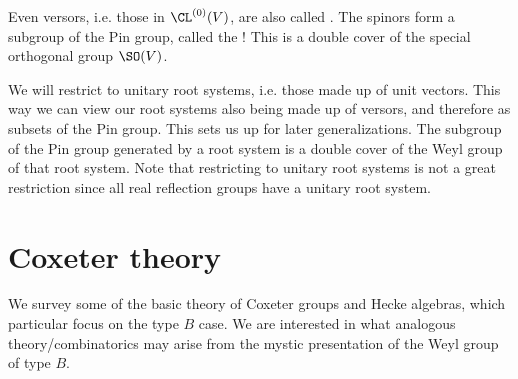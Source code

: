\nt Even versors, i.e. those in $\CL^{(0)}(V)$, are also called . The spinors form a subgroup of the Pin group, called the ! This is a double cover of the special orthogonal group $\SO(V)$.\bb

\nt We will restrict to unitary root systems, i.e. those made up of unit vectors. This way we can view our root systems also being made up of versors, and therefore as subsets of the Pin group. This sets us up for later generalizations. The subgroup of the Pin group generated by a root system is a double cover of the Weyl group of that root system. Note that restricting to unitary root systems is not a great restriction since all real reflection groups have a unitary root system.




\section{Coxeter theory}
We survey some of the basic theory of Coxeter groups and Hecke algebras, which particular focus on the type $B$ case. We are interested in what analogous theory/combinatorics may arise from the mystic presentation of the Weyl group of type $B$.

